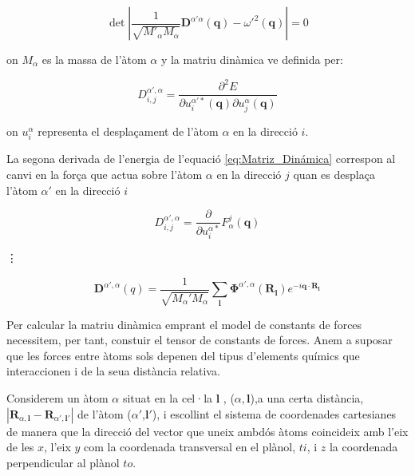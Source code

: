 \documentclass[12pt]{article} %
\let\vec\mathbf %
\begin{document}
{\begin{equation}
\label{eq:secular}
\det\left|\frac{1}{\sqrt{M'_\alpha M_{\alpha}}}\vec D^{\alpha'\alpha}\left(\vec q\right)-{\omega'}^2\left(\vec q\right)\right|=0 
\end{equation}

on $M_{\alpha}$ es la massa de l'àtom $\alpha$ y la matriu dinàmica ve definida per:

\begin{equation}
D^{\alpha',\alpha}_{i,j}=\frac{\partial^2 E}{\partial u^{\alpha'*}_i(\vec q)\partial u^{\alpha}_{j}(\vec q)}
\label{eq:Matriz_Dinámica}
\end{equation}

on $u^{\alpha}_{i}$ representa el despla\c{c}ament de l'àtom $\alpha$ en la direcció $i$.

La segona derivada de l'energia de l'equació \ref{eq:Matriz_Dinámica} correspon al canvi en la for\c{c}a que actua sobre l'àtom $\alpha$ en la direcció $j$ quan es despla\c{c}a l'àtom $\alpha'$ en la direcció $i$

\begin{equation}
D^{\alpha',\alpha}_{i,j}=\frac{\partial}{\partial u^{\alpha*}_{i}}F^{j}_{\alpha}(\vec q)
\end{equation}

\vdots

\begin{equation}
 \label{eq:matriu_dinàmica}
 \boxed{
 \vec D^{\alpha',\alpha}(q)=\frac{1}{\sqrt{M_\alpha' M_{\alpha}}}\sum_\vec l\vec\Phi^{\alpha',\alpha}\left(\vec R_\vec l\right)e^{-i\vec q\cdot\vec R_\vec l}}
\end{equation}




Per calcular la matriu dinàmica emprant el model de constants de forces necessitem, per tant, constuir el tensor de constants de forces. Anem a suposar que les forces entre àtoms sols depenen del tipus d'elements químics que interaccionen i de la seua distància relativa.

Considerem un àtom $\alpha$ situat en la cel·la $\vec l$ , ($\alpha, \vec l$),a una certa distància, $|\vec R_{\alpha,\vec l}-\vec R_{\alpha',\vec{l'}}|$ de l'àtom  ($\alpha'$,$\vec l'$), i escollint el sistema de coordenades cartesianes de manera que la direcció del vector que uneix ambdós àtoms coincideix amb l'eix de les $x$, l'eix $y$ com la coordenada transversal en el plànol, $ti$, i $z$ la coordenada perpendicular al plànol $to$.

}
\end{document}

